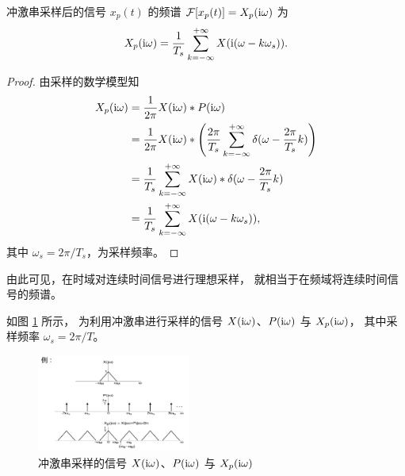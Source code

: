 \begin{property}
    冲激串采样后的信号 $x_p(t)$ 的频谱 $\mathcal{F}[x_p(t)] = X_p(\mathrm{i} \omega)$ 为
    \begin{align*}
        X_p(\mathrm{i} \omega) = \frac{1}{T_s}\sum_{k = -\infty}^{+\infty}X(\mathrm{i}(\omega - k\omega_s)).
    \end{align*}
    \label{property:impulse-sampling-frequency-2}
\end{property}

\begin{proof}
    由采样的数学模型知
    \begin{align*}
        X_p(\mathrm{i} \omega) & = \frac{1}{2\pi}X(\mathrm{i} \omega) * P(\mathrm{i} \omega) \\
        & = \frac{1}{2\pi}X(\mathrm{i} \omega) * \left(\frac{2\pi}{T_s}\sum_{k = -\infty}^{+\infty}\delta(\omega - \frac{2\pi}{T_s}k)\right) \\
        & = \frac{1}{T_s}\sum_{k = -\infty}^{+\infty}X(\mathrm{i} \omega) * \delta(\omega - \frac{2\pi}{T_s}k) \\
        & = \frac{1}{T_s}\sum_{k = -\infty}^{+\infty}X(\mathrm{i}(\omega - k\omega_s)),
    \end{align*}
    其中 $\omega_s = 2\pi/T_s$，为采样频率。
\end{proof}

\begin{remark}
    由此可见，在时域对连续时间信号进行理想采样，
    就相当于在频域将连续时间信号的频谱。
\end{remark}

\begin{example}
    如图 \ref{fig:impulse-sampling-frequency} 所示，
    为利用冲激串进行采样的信号 $X(\mathrm{i} \omega)$、$P(\mathrm{i} \omega)$ 与 $X_p(\mathrm{i} \omega)$，
    其中采样频率 $\omega_s = 2\pi/T$。
    \begin{figure}[H]
        \centering
        \includegraphics[width=0.45\textwidth]{chap2/img/impulse-sampling-frequency.png}
        \caption{冲激串采样的信号 $X(\mathrm{i} \omega)$、$P(\mathrm{i} \omega)$ 与 $X_p(\mathrm{i} \omega)$}
        \label{fig:impulse-sampling-frequency}
    \end{figure}
\end{example}

